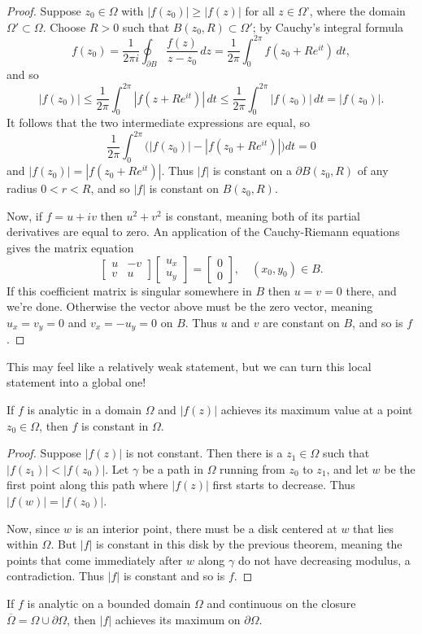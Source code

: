 \documentclass[../m136main.tex]{subfiles}
\begin{document}
\begin{proof}
    Suppose $z_0 \in \Omega$ with $|f(z_0)| \geq |f(z)|$ for all $z \in \Omega$', where the domain $\Omega' \subset \Omega$.
    Choose $R > 0$ such that $B(z_0, R) \subset \Omega'$; by Cauchy's integral formula
    \[ f(z_0) = \frac{1}{2\pi i} \oint_{\partial B} \frac{f(z)}{z - z_0} \,dz = \frac{1}{2\pi} \int_{0}^{2\pi} f(z_0 + Re^{it}) \,dt, \]
    and so
    \[ |f(z_0)| \leq \frac{1}{2\pi} \int_{0}^{2\pi} |f(z + Re^{it})| \,dt \leq \frac{1}{2\pi} \int_{0}^{2\pi} |f(z_0)| \,dt = |f(z_0)|. \]
    It follows that the two intermediate expressions are equal, so
    \[ \frac{1}{2\pi} \int_{0}^{2\pi} \Big( |f(z_0)| - |f(z_0 + Re^{it})| \Big) dt = 0 \]
    and $|f(z_0)| = |f(z_0 + Re^{it})|$.
    Thus $|f|$ is constant on a $\partial B(z_0, R)$ of any radius $0 < r < R$, and so $|f|$ is constant on $B(z_0, R)$.

    Now, if $f = u + iv$ then $u^2 + v^2$ is constant, meaning both of its partial derivatives are equal to zero.
    An application of the Cauchy-Riemann equations gives the matrix equation
    \[ \begin{bmatrix} u & -v \\ v & u \end{bmatrix} \begin{bmatrix} u_x \\ u_y \end{bmatrix} = \begin{bmatrix} 0 \\ 0 \end{bmatrix}, \quad (x_0, y_0) \in B. \]
    If this coefficient matrix is singular somewhere in $B$ then $u = v = 0$ there, and we're done.
    Otherwise the vector above must be the zero vector, meaning $u_x = v_y = 0$ and $v_x = -u_y = 0$ on $B$.
    Thus $u$ and $v$ are constant on $B$, and so is $f$.
\end{proof}

This may feel like a relatively weak statement, but we can turn this local statement into a global one!

\begin{corollary}[]
    If $f$ is analytic in a domain $\Omega$ and $|f(z)|$ achieves its maximum value at a point $z_0 \in \Omega$, then $f$ is constant in $\Omega$.
\end{corollary}

\begin{proof}
    Suppose $|f(z)|$ is not constant.
    Then there is a $z_1 \in \Omega$ such that $|f(z_1)| < |f(z_0)|$.
    Let $\gamma$ be a path in $\Omega$ running from $z_0$ to $z_1$, and let $w$ be the first point along this path where $|f(z)|$ first starts to decrease.
    Thus $|f(w)| = |f(z_0)|$.

    Now, since $w$ is an interior point, there must be a disk centered at $w$ that lies within $\Omega$.
    But $|f|$ is constant in this disk by the previous theorem, meaning the points that come immediately after $w$ along $\gamma$ do not have decreasing modulus, a contradiction.
    Thus $|f|$ is constant and so is $f$.
\end{proof}

\begin{corollary}[]
    If $f$ is analytic on a bounded domain $\Omega$ and continuous on the closure $\overline \Omega = \Omega \cup \partial \Omega$, then $|f|$ achieves its maximum on $\partial \Omega$.
\end{corollary}
\end{document}
